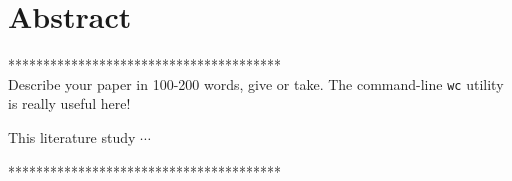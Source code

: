 %
\chapter*{Abstract}%

***************************************\\
Describe your paper in 100-200 words, give or take.  The command-line \texttt{wc} utility is really useful here! 

This literature study $ \cdots  $\\
\lipsum[1]


***************************************\\